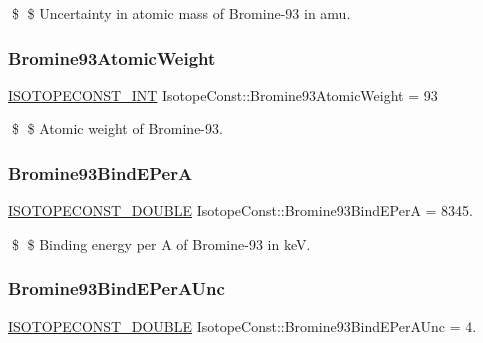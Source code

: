 \$ \$ Uncertainty in atomic mass of Bromine-\/93 in amu. \mbox{\label{group___isotope_const-_bromine-_br93_ga634739e3308f34f30f576382512b4967}} 
\subsubsection{\texorpdfstring{Bromine93\+Atomic\+Weight}{Bromine93AtomicWeight}}
{\footnotesize\ttfamily \mbox{\hyperlink{group___isotope_const-_macros_ga5f18360b3e99483a35c32d789e62621c}{I\+S\+O\+T\+O\+P\+E\+C\+O\+N\+S\+T\+\_\+\+I\+NT}} Isotope\+Const\+::\+Bromine93\+Atomic\+Weight = 93}

\$ \$ Atomic weight of Bromine-\/93. \mbox{\label{group___isotope_const-_bromine-_br93_ga24ce03d1d6b3f119e5cf1382a7a1feb9}} 
\subsubsection{\texorpdfstring{Bromine93\+Bind\+E\+PerA}{Bromine93BindEPerA}}
{\footnotesize\ttfamily \mbox{\hyperlink{group___isotope_const-_macros_ga8f45a7272ce02c0b4c65c44636ed719a}{I\+S\+O\+T\+O\+P\+E\+C\+O\+N\+S\+T\+\_\+\+D\+O\+U\+B\+LE}} Isotope\+Const\+::\+Bromine93\+Bind\+E\+PerA = 8345.}

\$ \$ Binding energy per A of Bromine-\/93 in keV. \mbox{\label{group___isotope_const-_bromine-_br93_ga88bc6777864bfb164380a1ca11c6d7f3}} 
\subsubsection{\texorpdfstring{Bromine93\+Bind\+E\+Per\+A\+Unc}{Bromine93BindEPerAUnc}}
{\footnotesize\ttfamily \mbox{\hyperlink{group___isotope_const-_macros_ga8f45a7272ce02c0b4c65c44636ed719a}{I\+S\+O\+T\+O\+P\+E\+C\+O\+N\+S\+T\+\_\+\+D\+O\+U\+B\+LE}} Isotope\+Const\+::\+Bromine93\+Bind\+E\+Per\+A\+Unc = 4.}

